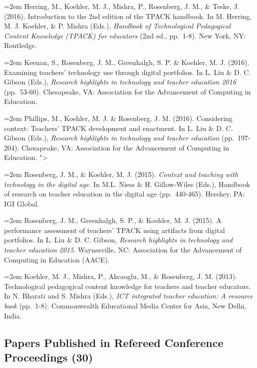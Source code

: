 \documentclass[
  14,
]{article}
\begin{document}
\hangindent=2em Herring, M., Koehler, M. J., Mishra, P., Rosenberg, J.
M., \& Teske, J. (2016). Introduction to the 2nd edition of the TPACK
handbook. In M. Herring, M. J. Koehler, \& P. Mishra (Eds.),
\emph{Handbook of Technological Pedagogical Content Knowledge (TPACK)
for educators} (2nd ed., pp.~1-8). New York, NY: Routledge.

\hangindent=2em Keenan, S., Rosenberg, J. M., Greenhalgh, S. P. \&
Koehler, M. J. (2016). Examining teachers' technology use through
digital portfolios. In L. Liu \& D. C. Gibson (Eds.), \emph{Research
highlights in technology and teacher education 2016} (pp.~53-60).
Chesapeake, VA: Association for the Advancement of Computing in
Education.

\hangindent=2em Phillips, M., Koehler, M. J. \& Rosenberg, J. M. (2016).
Considering context: Teachers' TPACK development and enactment. In L.
Liu \& D. C. Gibson (Eds.), \emph{Research highlights in technology and
teacher education} (pp.~197-204). Chesapeake, VA: Association for the
Advancement of Computing in Education. "\textgreater{}

\hangindent=2em Rosenberg, J. M., \& Koehler, M. J. (2015).
\emph{Context and teaching with technology in the digital age}. In M.L.
Niess \& H. Gillow-Wiles (Eds.), Handbook of research on teacher
education in the digital age (pp.~440-465). Hershey, PA: IGI Global.

\hangindent=2em Rosenberg, J. M., Greenhalgh, S. P., \& Koehler, M. J.
(2015). A performance assessment of teachers' TPACK using artifacts from
digital portfolios. In L. Liu \& D. C. Gibson, \emph{Research highlights
in technology and teacher education 2015}. Waynesville, NC: Association
for the Advancement of Computing in Education (AACE).

\hangindent=2em Koehler, M. J., Mishra, P., Akcaoglu, M., \& Rosenberg,
J. M. (2013). Technological pedagogical content knowledge for teachers
and teacher educators. In N. Bharati and S. Mishra (Eds.), \emph{ICT
integrated teacher education: A resource book} (pp.~1-8). Commonwealth
Educational Media Center for Asia, New Delhi, India.

\hypertarget{papers-published-in-refereed-conference-proceedings-30}{%
\subsection{Papers Published in Refereed Conference Proceedings
(30)}\label{papers-published-in-refereed-conference-proceedings-30}}
\end{document}
